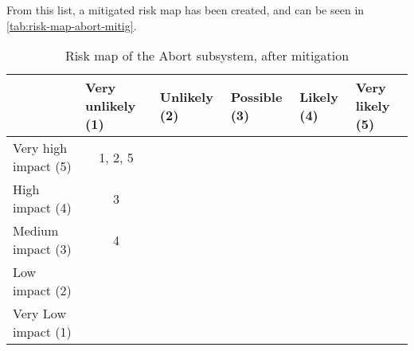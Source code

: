 \noindent From this list, a mitigated risk map has been created, and can be seen in \autoref{tab:risk-map-abort-mitig}.

\begin{table}[H]
\centering
\caption{Risk map of the Abort subsystem, after mitigation}
\label{tab:risk-map-abort-mitig}\begin{tabular}{l|c|c|c|c|c|}
\cline{2-6}
& \multicolumn{1}{l|}{Very unlikely (1)} & \multicolumn{1}{l|}{Unlikely (2)} & \multicolumn{1}{l|}{Possible (3)} & \multicolumn{1}{l|}{Likely (4)} & \multicolumn{1}{l|}{Very likely (5)} \\ \hline
\multicolumn{1}{|l|}{Very high impact (5)} & \cellcolor{rm-3}1, 2, 5 & \cellcolor{rm-3} & \cellcolor{rm-3} & \cellcolor{rm-3} & \cellcolor{rm-3}\\ \hline 
\multicolumn{1}{|l|}{High impact (4)} & \cellcolor{rm-2}3 & \cellcolor{rm-2} & \cellcolor{rm-2} & \cellcolor{rm-3} & \cellcolor{rm-3}\\ \hline 
\multicolumn{1}{|l|}{Medium impact (3)} & \cellcolor{rm-0}4 & \cellcolor{rm-1} & \cellcolor{rm-1} & \cellcolor{rm-2} & \cellcolor{rm-3}\\ \hline 
\multicolumn{1}{|l|}{Low impact (2)} & \cellcolor{rm-0} & \cellcolor{rm-0} & \cellcolor{rm-1} & \cellcolor{rm-2} & \cellcolor{rm-3}\\ \hline 
\multicolumn{1}{|l|}{Very Low impact (1)} & \cellcolor{rm-0} & \cellcolor{rm-0} & \cellcolor{rm-0} & \cellcolor{rm-2} & \cellcolor{rm-3}\\ \hline 
\end{tabular} 
\end{table}


